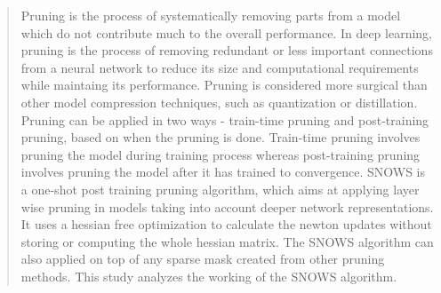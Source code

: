 \documentclass[journal]{IEEEtran}
\begin{document}







\maketitle

\begin{abstract}
Pruning is the process of systematically removing parts from a model which do not contribute much to the overall performance. In deep learning, pruning is the process of removing redundant or less important connections from a neural network to reduce its size and computational requirements while maintaing its performance. Pruning is considered more surgical than other model compression techniques, such as quantization or distillation. Pruning can be applied in two ways - train-time pruning and post-training pruning, based on when the pruning is done. Train-time pruning involves pruning the model during training process whereas post-training pruning involves pruning the model after it has trained to convergence. SNOWS is a one-shot post training pruning algorithm, which aims at applying layer wise pruning in models taking into account deeper network representations. It uses a hessian free optimization to calculate the newton updates without storing or computing the whole hessian matrix. The SNOWS algorithm can also applied on top of any sparse mask created from other pruning methods. This study analyzes the working of the SNOWS algorithm.
\end{abstract}



  



%
\IEEEpeerreviewmaketitle
\end{document}
